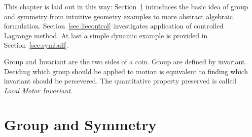 This chapter is laid out in this way:
Section~\ref{sec:groupandsymmetry} introduces the basic idea of group and symmetry from intuitive geometry examples to more abstract algebraic formulation. Section~\ref{sec:liecontrol} investigates application of controlled Lagrange method.
At last a simple dynamic example is provided in Section~\ref{sec:symball}.

Group and Invariant are the two sides of a coin.
Group are defined by invariant.
Deciding which group should be applied to motion is equivalent to finding which invariant should be persevered.
The quantitative property preserved is called \emph{Local Motor Invariant}.







\section{Group and Symmetry}
\label{sec:groupandsymmetry}
%
%



